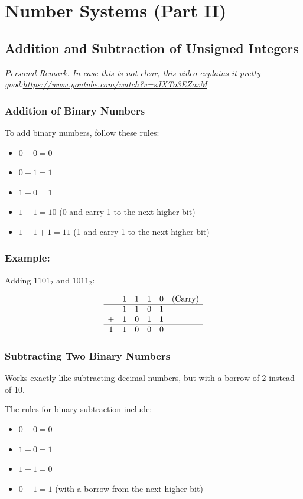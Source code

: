 \documentclass[12pt,openany, tikz,border=10pt]{book}
\begin{document}
\chapter{Number Systems (Part II)}

\section{Addition and Subtraction
of Unsigned Integers}
\textit{Personal Remark. In case this is not clear, this video explains it pretty good:\newline \url{https://www.youtube.com/watch?v=sJXTo3EZoxM}}
\subsection{Addition of Binary Numbers}

To add binary numbers, follow these rules:
\begin{itemize}
    \item[] \(0 + 0 = 0\)
    \item[] \(0 + 1 = 1\)
    \item[] \(1 + 0 = 1\)
    \item[] \(1 + 1 = 10\) (0 and carry 1 to the next higher bit)
    \item[] \(1 + 1 + 1 = 11\) (1 and carry 1 to the next higher bit)
\end{itemize}

\subsection*{Example:}

Adding \(1101_2\) and \(1011_2\):

\[
\begin{array}{cccccc}
& 1 & 1 & 1 & 0 & \text{(Carry)} \\
\hline
 & 1 & 1 & 0 & 1 & \\
+ & 1 & 0 & 1 & 1 & \\
\hline
1 & 1 & 0 & 0 & 0 & \\
\end{array}
\]


\newpage
\subsection{Subtracting Two Binary Numbers}
Works exactly like subtracting decimal numbers, but with a borrow of 2 instead of 10.

The rules for binary subtraction include:
\begin{itemize}
    \item[] \(0 - 0 = 0\)
    \item[] \(1 - 0 = 1\)
    \item[] \(1 - 1 = 0\)
    \item[] \(0 - 1 = 1\) (with a borrow from the next higher bit)
\end{itemize}
\end{document}
